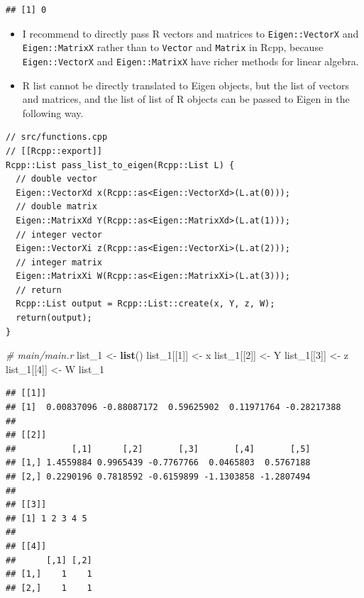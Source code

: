 \documentclass[]{book}
\newenvironment{Shaded}{\begin{snugshade}}{\end{snugshade}}
\newcommand{\KeywordTok}[1]{\textcolor[rgb]{0.13,0.29,0.53}{\textbf{#1}}}
\newcommand{\DecValTok}[1]{\textcolor[rgb]{0.00,0.00,0.81}{#1}}
\newcommand{\StringTok}[1]{\textcolor[rgb]{0.31,0.60,0.02}{#1}}
\newcommand{\CommentTok}[1]{\textcolor[rgb]{0.56,0.35,0.01}{\textit{#1}}}
\newcommand{\NormalTok}[1]{#1}
\begin{document}
\begin{verbatim}
## [1] 0
\end{verbatim}

\begin{itemize}
\item
  I recommend to directly pass R vectors and matrices to
  \texttt{Eigen::VectorX} and \texttt{Eigen::MatrixX} rather than to
  \texttt{Vector} and \texttt{Matrix} in Rcpp, because
  \texttt{Eigen::VectorX} and \texttt{Eigen::MatrixX} have richer
  methods for linear algebra.
\item
  R list cannot be directly translated to Eigen objects, but the list of
  vectors and matrices, and the list of list of R objects can be passed
  to Eigen in the following way.
\end{itemize}

\begin{verbatim}
// src/functions.cpp
// [[Rcpp::export]]
Rcpp::List pass_list_to_eigen(Rcpp::List L) {
  // double vector
  Eigen::VectorXd x(Rcpp::as<Eigen::VectorXd>(L.at(0)));
  // double matrix
  Eigen::MatrixXd Y(Rcpp::as<Eigen::MatrixXd>(L.at(1)));
  // integer vector
  Eigen::VectorXi z(Rcpp::as<Eigen::VectorXi>(L.at(2)));
  // integer matrix
  Eigen::MatrixXi W(Rcpp::as<Eigen::MatrixXi>(L.at(3)));
  // return
  Rcpp::List output = Rcpp::List::create(x, Y, z, W);
  return(output);
}
\end{verbatim}

\begin{Shaded}
\begin{Highlighting}[]
\CommentTok{# main/main.r}
\NormalTok{list_}\DecValTok{1}\NormalTok{ <-}\StringTok{ }\KeywordTok{list}\NormalTok{()}
\NormalTok{list_}\DecValTok{1}\NormalTok{[[}\DecValTok{1}\NormalTok{]] <-}\StringTok{ }\NormalTok{x}
\NormalTok{list_}\DecValTok{1}\NormalTok{[[}\DecValTok{2}\NormalTok{]] <-}\StringTok{ }\NormalTok{Y}
\NormalTok{list_}\DecValTok{1}\NormalTok{[[}\DecValTok{3}\NormalTok{]] <-}\StringTok{ }\NormalTok{z}
\NormalTok{list_}\DecValTok{1}\NormalTok{[[}\DecValTok{4}\NormalTok{]] <-}\StringTok{ }\NormalTok{W}
\NormalTok{list_}\DecValTok{1}
\end{Highlighting}
\end{Shaded}

\begin{verbatim}
## [[1]]
## [1]  0.00837096 -0.88087172  0.59625902  0.11971764 -0.28217388
## 
## [[2]]
##           [,1]      [,2]       [,3]       [,4]       [,5]
## [1,] 1.4559884 0.9965439 -0.7767766  0.0465803  0.5767188
## [2,] 0.2290196 0.7818592 -0.6159899 -1.1303858 -1.2807494
## 
## [[3]]
## [1] 1 2 3 4 5
## 
## [[4]]
##      [,1] [,2]
## [1,]    1    1
## [2,]    1    1
\end{verbatim}
\end{document}
